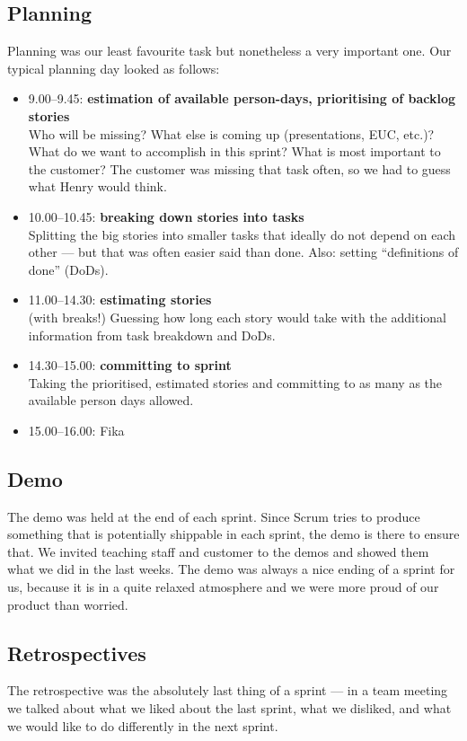 \documentclass[11pt,a4paper]{report}
\begin{document}
\subsection{Planning}
Planning was our least favourite task but nonetheless a very important one.
Our typical planning day looked as follows:
\begin{itemize}
\item 9.00--9.45: {\bf estimation of available person-days,
  prioritising of backlog stories}\\
  Who will be missing? What else is coming up (presentations, EUC, etc.)?
  What do we want to accomplish in this sprint?
  What is most important to the customer? The customer was missing that task
  often, so we had to guess what Henry would think.
\item 10.00--10.45: {\bf breaking down stories into tasks}\\
  Splitting the big stories into smaller tasks that ideally do not depend on
  each other --- but that was often easier said than done.
  Also: setting ``definitions of done'' (DoDs).
\item 11.00--14.30: {\bf estimating stories}\\
  (with breaks!)
  Guessing how long each story would take with the additional information from
  task breakdown and DoDs.
\item 14.30--15.00: {\bf committing to sprint}\\
  Taking the prioritised, estimated stories and committing to as many as the
  available person days allowed.
\item 15.00--16.00: Fika
\end{itemize}

\subsection{Demo}
The demo was held at the end of each sprint. Since Scrum tries to produce
something that is potentially shippable in each sprint, the demo is there to
ensure that. We invited teaching staff and customer to the demos and showed them
what we did in the last weeks. The demo was always a nice ending of a sprint for
us, because it is in a quite relaxed atmosphere and we were more proud of our
product than worried.

\subsection{Retrospectives}
The retrospective was the absolutely last thing of a sprint --- in a team
meeting we talked about what we liked about the last sprint, what we disliked,
and what we would like to do differently in the next sprint.
\end{document}
